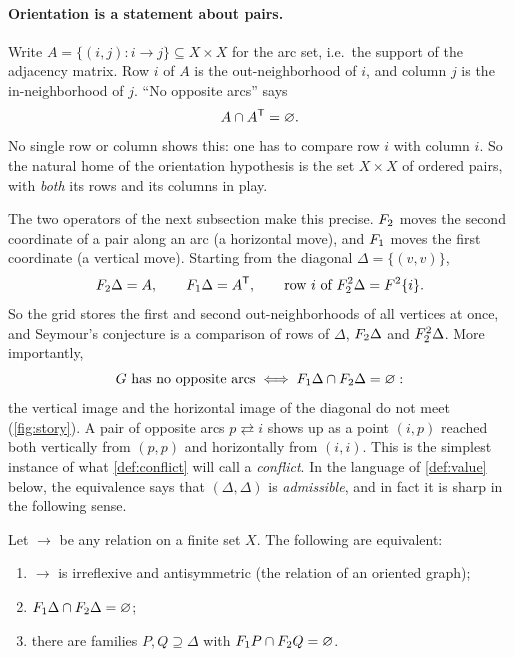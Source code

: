 \paragraph{Orientation is a statement about pairs.}
Write $A=\{(i,j): i\to j\}\subseteq X\times X$ for the arc set, i.e.\ the
support of the adjacency matrix. Row $i$ of $A$ is the out-neighborhood of
$i$, and column $j$ is the in-neighborhood of $j$. ``No opposite arcs''
says
\[
 A\cap A^{\mathsf T}=\varnothing .
\]
No single row or column shows this: one has to compare row $i$ with column
$i$. So the natural home of the orientation hypothesis is the set
$X\times X$ of ordered pairs, with \emph{both} its rows and its columns in
play.

The two operators of the next subsection make this precise. $F_2$ moves the
second coordinate of a pair along an arc (a horizontal move), and $F_1$
moves the first coordinate (a vertical move). Starting from the diagonal
$\Delta=\{(v,v)\}$,
\[
 F_2\Delta=A,\qquad F_1\Delta=A^{\mathsf T},\qquad
 \text{row } i \text{ of } F_2^2\Delta = F^2\{i\}.
\]
So the grid stores the first and second out-neighborhoods of all vertices at
once, and Seymour's conjecture is a comparison of rows of $\Delta$,
$F_2\Delta$ and $F_2^2\Delta$. More importantly,
\[
 G\text{ has no opposite arcs}\iff F_1\Delta\cap F_2\Delta=\varnothing :
\]
the vertical image and the horizontal image of the diagonal do not meet
(\cref{fig:story}). A pair of opposite arcs $p\rightleftarrows i$ shows up
as a point $(i,p)$ reached both vertically from $(p,p)$ and horizontally
from $(i,i)$. This is the simplest instance of what \cref{def:conflict} will
call a \emph{conflict}. In the language of \cref{def:value} below, the
equivalence says that $(\Delta,\Delta)$ is \emph{admissible}, and in fact
it is sharp in the following sense.

\begin{lemma}\label{lem:admissible-iff-oriented}
Let $\to$ be any relation on a finite set $X$. The following are equivalent:
\begin{enumerate}[label=(\roman*)]
\item $\to$ is irreflexive and antisymmetric (the relation of an oriented graph);
\item $F_1\Delta\cap F_2\Delta=\varnothing$;
\item there are families $P,Q\supseteq\Delta$ with $F_1 P\cap F_2 Q=\varnothing$.
\end{enumerate}
\end{lemma}

